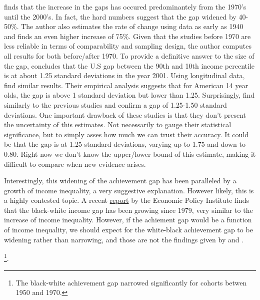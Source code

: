 \documentclass[11pt, a4paper]{article}\usepackage[]{graphicx}\usepackage[]{color}
\begin{document}
\citet{reardon2011} finds that the increase in the gaps has occured predominantely from the 1970's until the 2000's. In fact, the hard numbers suggest that the gap widened by 40-50\%. The author also estimates the rate of change using data as early as 1940 and finds an even higher increase of   75\%. Given that the studies before 1970 are less reliable in terms of comparability and sampling design, the author computes all results for both before/after 1970. To provide a definitive answer to the size of the gap, \citet{reardon2011} concludes that the U.S gap between the 90th and 10th income percentile is at about 1.25 standard deviations in the year 2001. Using longitudinal data, \citet{bradbury2015} find similar results. Their empirical analysis suggests that for American 14 year olds, the gap is above 1 standard deviation but lower than 1.25. Surprisingly, \citet{duncan2011} find similarly to the previous studies and confirm a gap of  1.25-1.50 standard deviations. One important drawback of these studies is that they don't present the uncertainty of this estimates. Not necessarily to gauge their statistical significance, but to simply asses how much we can trust their accuracy. It could be that the gap is at  1.25 standard deviations, varying up to 1.75 and down to 0.80. Right now we don't know the upper/lower bound of this estimate, making it difficult to compare when new evidence arises.

Interestingly, this widening of the achievement gap has been paralleled by a growth of income inequality, a very suggestive explanation. However likely, this is a highly contested topic. A recent \href{http://www.epi.org/files/pdf/101972.pdf}{report} by the Economic Policy Institute finds that the black-white income gap has been growing since 1979, very similar to the increase of income inequality. However, if the achiement gap would be a function of income inequality, we should expect for the white-black achievement gap to be widening rather than narrowing, and those are not the findings given by \citet{reardon2011} and \citet{magnuson2008}.

\footnote{The black-white achievement gap narrowed significantly for cohorts betwen 1950 and 1970.}.
\end{document}
